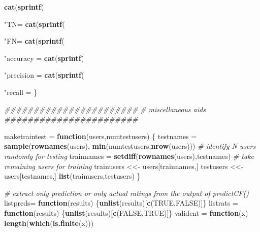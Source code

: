 \documentclass[]{article}
\newenvironment{Shaded}{\begin{snugshade}}{\end{snugshade}}
\newcommand{\CharTok}[1]{\textcolor[rgb]{0.31,0.60,0.02}{#1}}
\newcommand{\CommentTok}[1]{\textcolor[rgb]{0.56,0.35,0.01}{\textit{#1}}}
\newcommand{\ControlFlowTok}[1]{\textcolor[rgb]{0.13,0.29,0.53}{\textbf{#1}}}
\newcommand{\DecValTok}[1]{\textcolor[rgb]{0.00,0.00,0.81}{#1}}
\newcommand{\KeywordTok}[1]{\textcolor[rgb]{0.13,0.29,0.53}{\textbf{#1}}}
\newcommand{\NormalTok}[1]{#1}
\newcommand{\OperatorTok}[1]{\textcolor[rgb]{0.81,0.36,0.00}{\textbf{#1}}}
\newcommand{\OtherTok}[1]{\textcolor[rgb]{0.56,0.35,0.01}{#1}}
\newcommand{\StringTok}[1]{\textcolor[rgb]{0.31,0.60,0.02}{#1}}
\begin{document}
\begin{Shaded}
\begin{Highlighting}[]
  \KeywordTok{cat}\NormalTok{(}\KeywordTok{sprintf}\NormalTok{(}\StringTok{"TN=%5d FP=%5d}\CharTok{\textbackslash{}n}\StringTok{"}\NormalTok{,s[}\DecValTok{3}\NormalTok{],s[}\DecValTok{2}\NormalTok{]))}
  \KeywordTok{cat}\NormalTok{(}\KeywordTok{sprintf}\NormalTok{(}\StringTok{"FN=%5d TP=%5d  (total=%d)}\CharTok{\textbackslash{}n}\StringTok{"}\NormalTok{,s[}\DecValTok{4}\NormalTok{],s[}\DecValTok{1}\NormalTok{], }\KeywordTok{sum}\NormalTok{(s)))}
  \KeywordTok{cat}\NormalTok{(}\KeywordTok{sprintf}\NormalTok{(}\StringTok{"accuracy  = %0.1f%%}\CharTok{\textbackslash{}n}\StringTok{"}\NormalTok{,(s[}\DecValTok{1}\NormalTok{]}\OperatorTok{+}\NormalTok{s[}\DecValTok{3}\NormalTok{])}\OperatorTok{*}\DecValTok{100}\OperatorTok{/}\KeywordTok{sum}\NormalTok{(s)))}
  \KeywordTok{cat}\NormalTok{(}\KeywordTok{sprintf}\NormalTok{(}\StringTok{"precision = %3.1f%%}\CharTok{\textbackslash{}n}\StringTok{"}\NormalTok{,s[}\DecValTok{1}\NormalTok{]}\OperatorTok{*}\DecValTok{100}\OperatorTok{/}\NormalTok{(s[}\DecValTok{1}\NormalTok{]}\OperatorTok{+}\NormalTok{s[}\DecValTok{2}\NormalTok{])))}
  \KeywordTok{cat}\NormalTok{(}\KeywordTok{sprintf}\NormalTok{(}\StringTok{"recall    = %3.1f%%}\CharTok{\textbackslash{}n}\StringTok{"}\NormalTok{,s[}\DecValTok{1}\NormalTok{]}\OperatorTok{*}\DecValTok{100}\OperatorTok{/}\NormalTok{(s[}\DecValTok{1}\NormalTok{]}\OperatorTok{+}\NormalTok{s[}\DecValTok{4}\NormalTok{])))}
\NormalTok{\}}

\CommentTok{#######################}
\CommentTok{# miscellaneous aids}
\CommentTok{#######################}

\NormalTok{maketraintest =}\StringTok{ }\ControlFlowTok{function}\NormalTok{(users,numtestusers) \{}
\NormalTok{  testnames  =}\StringTok{ }\KeywordTok{sample}\NormalTok{(}\KeywordTok{rownames}\NormalTok{(users), }\KeywordTok{min}\NormalTok{(numtestusers,}\KeywordTok{nrow}\NormalTok{(users))) }\CommentTok{# identify N users randomly for testing}
\NormalTok{  trainnames =}\StringTok{ }\KeywordTok{setdiff}\NormalTok{(}\KeywordTok{rownames}\NormalTok{(users),testnames) }\CommentTok{# take remaining users for training}
\NormalTok{  trainusers <<-}\StringTok{ }\NormalTok{users[trainnames,]}
\NormalTok{  testusers  <<-}\StringTok{ }\NormalTok{users[testnames,]}
  \KeywordTok{list}\NormalTok{(trainusers,testusers)}
\NormalTok{\}}

\CommentTok{# extract only prediction or only actual ratings from the output of predictCF()}
\NormalTok{listpreds=}\StringTok{ }\ControlFlowTok{function}\NormalTok{(results) \{}\KeywordTok{unlist}\NormalTok{(results)[}\KeywordTok{c}\NormalTok{(}\OtherTok{TRUE}\NormalTok{,}\OtherTok{FALSE}\NormalTok{)]\}}
\NormalTok{listrats =}\StringTok{ }\ControlFlowTok{function}\NormalTok{(results) \{}\KeywordTok{unlist}\NormalTok{(results)[}\KeywordTok{c}\NormalTok{(}\OtherTok{FALSE}\NormalTok{,}\OtherTok{TRUE}\NormalTok{)]\}}
\NormalTok{validcnt =}\StringTok{ }\ControlFlowTok{function}\NormalTok{(x) }\KeywordTok{length}\NormalTok{(}\KeywordTok{which}\NormalTok{(}\KeywordTok{is.finite}\NormalTok{(x)))}

}}}}}
\end{Highlighting}
\end{Shaded}
\end{document}
